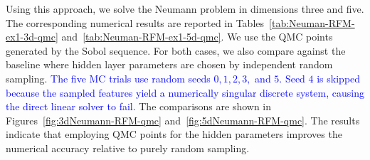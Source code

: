 \documentclass{article}
\theoremstyle{remark}
\begin{document}




Using this approach, we solve the Neumann problem in dimensions three and five. 
The corresponding numerical results are reported in 
Tables~\ref{tab:Neuman-RFM-ex1-3d-qmc} and~\ref{tab:Neuman-RFM-ex1-5d-qmc}. 
We use the QMC points generated by the Sobol sequence. 
For both cases, we also compare against the baseline where hidden layer parameters 
are chosen by independent random sampling.
\textcolor{blue}{The five MC trials use random seeds \(0,1,2,3,\) and \(5\).
Seed \(4\) is skipped because the sampled features yield a numerically singular discrete system, causing the direct linear solver to fail.}
The comparisons are shown in Figures~\ref{fig:3dNeumann-RFM-qmc} and~\ref{fig:5dNeumann-RFM-qmc}. 
The results indicate that employing QMC points for the hidden parameters improves the numerical accuracy relative to purely random sampling.
\end{document}
